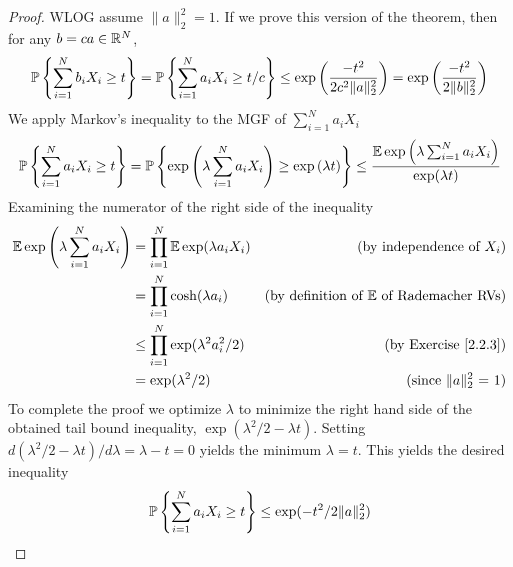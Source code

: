 {\begin{proof}
WLOG assume $\|a\|_2^2 = 1$. If we prove this version of the theorem, then for any $b = ca \in \mathbb{R}^N$,
\begin{align*}
    \mathbb{P} \left\{\sum_{i=1}^N b_i X_i \geq t\right\} = \mathbb{P} \left\{\sum_{i=1}^N a_i X_i \geq t/c\right\} \leq \exp\left( \frac {-t^2}{2c^2\|a\|^2_2}\right) = \exp\left( \frac {-t^2}{2\|b\|^2_2}\right)
\end{align*}
We apply Markov's inequality to the MGF of $\sum_{i=1}^N a_iX_i$
\begin{align*}
    \mathbb{P} \left\{\sum_{i=1}^N a_i X_i \geq t\right\} = \mathbb{P} \left\{\exp\left(\lambda\sum_{i=1}^N a_i X_i\right) \geq \exp\left(\lambda t\right)\right\} \leq \frac {\mathbb{E} \exp\left(\lambda\sum_{i=1}^N a_i X_i \right)} {\exp(\lambda t)}
\end{align*}
Examining the numerator of the right side of the inequality
\begin{align*}
    \mathbb{E} \exp\left(\lambda\sum_{i=1}^N a_i X_i \right) &= \prod_{i=1}^N\mathbb{E} \exp(\lambda a_iX_i) &\text{(by independence of $X_i$)}\\
    &= \prod_{i=1}^N \cosh(\lambda a_i) &\text{(by definition of $\mathbb{E}$ of Rademacher RVs)}\\
    &\leq \prod_{i=1}^N \exp(\lambda^2 a_i^2/2) &\text{(by Exercise \ref{2.2.3})}\\
    &= \exp(\lambda^2/2) &\text{(since $\|a\|_2^2$ = 1)}
\end{align*}
To complete the proof we optimize $\lambda$ to minimize the right hand side of the obtained tail bound inequality, $\exp(\lambda^2/2 - \lambda t)$.
Setting $d(\lambda^2/2 - \lambda t)/d\lambda = \lambda - t = 0$ yields the minimum $\lambda = t$. This yields the desired inequality
\begin{align*}
    \mathbb{P} \left\{\sum_{i=1}^N a_i X_i \geq t\right\} \leq \exp(-t^2/2\|a\|_2^2)
\end{align*} 
\end{proof}

}
